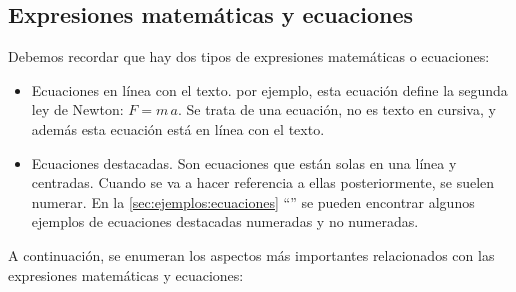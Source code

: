 \documentclass[11pt]{article}
\begin{document}
\subsection{Expresiones matemáticas y ecuaciones}

Debemos recordar que hay dos tipos de expresiones matemáticas o ecuaciones:

\begin{itemize}

    \item Ecuaciones en línea con el texto. por ejemplo, esta ecuación define la segunda ley de Newton: $F = m\,a$. Se trata de una ecuación, no es texto en cursiva, y además esta ecuación está en línea con el texto.
	
	\item Ecuaciones destacadas. Son ecuaciones que están solas en una línea y centradas. Cuando se va a hacer referencia a ellas posteriormente, se suelen numerar. En la \autoref{sec:ejemplos:ecuaciones} ``'' se pueden encontrar algunos ejemplos de ecuaciones destacadas numeradas y no numeradas.
	
\end{itemize}

A continuación, se enumeran los aspectos más importantes relacionados con las expresiones matemáticas y ecuaciones:
\end{document}
